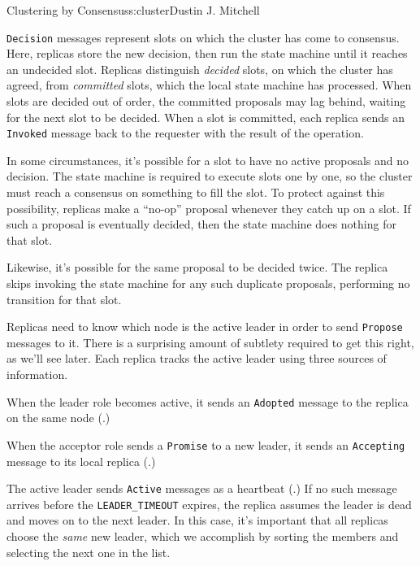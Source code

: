 \begin{aosachapter}{Clustering by Consensus}{s:cluster}{Dustin J. Mitchell}

\texttt{Decision} messages represent slots on which the cluster has come
to consensus. Here, replicas store the new decision, then run the state
machine until it reaches an undecided slot. Replicas distinguish
\emph{decided} slots, on which the cluster has agreed, from
\emph{committed} slots, which the local state machine has processed.
When slots are decided out of order, the committed proposals may lag
behind, waiting for the next slot to be decided. When a slot is
committed, each replica sends an \texttt{Invoked} message back to the
requester with the result of the operation.

In some circumstances, it's possible for a slot to have no active
proposals and no decision. The state machine is required to execute
slots one by one, so the cluster must reach a consensus on something to
fill the slot. To protect against this possibility, replicas make a
``no-op'' proposal whenever they catch up on a slot. If such a proposal
is eventually decided, then the state machine does nothing for that
slot.

Likewise, it's possible for the same proposal to be decided twice. The
replica skips invoking the state machine for any such duplicate
proposals, performing no transition for that slot.

Replicas need to know which node is the active leader in order to send
\texttt{Propose} messages to it. There is a surprising amount of
subtlety required to get this right, as we'll see later. Each replica
tracks the active leader using three sources of information.

When the leader role becomes active, it sends an \texttt{Adopted}
message to the replica on the same node
(.)


When the acceptor role sends a \texttt{Promise} to a new leader, it
sends an \texttt{Accepting} message to its local replica
(.)


The active leader sends \texttt{Active} messages as a heartbeat
(.) If no such message arrives before
the \texttt{LEADER\_TIMEOUT} expires, the replica assumes the leader is
dead and moves on to the next leader. In this case, it's important that
all replicas choose the \emph{same} new leader, which we accomplish by
sorting the members and selecting the next one in the list.


\end{aosachapter}
